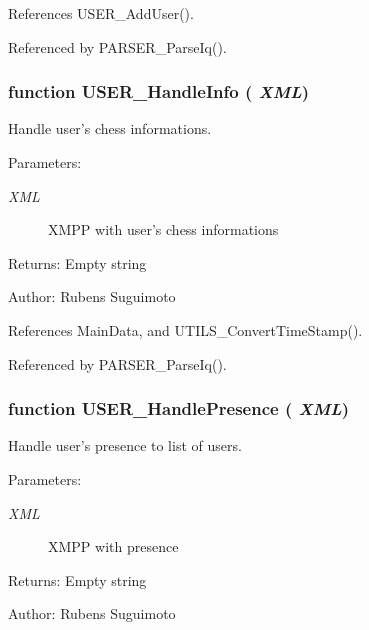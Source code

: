 References USER\_\-AddUser().

Referenced by PARSER\_\-ParseIq().
\subsubsection[USER\_\-HandleInfo]{\setlength{\rightskip}{0pt plus 5cm}function USER\_\-HandleInfo ( {\em XML})}\label{contact_2user_8js_a36e9957d410602ff4b4d465a2ec6444}


Handle user's chess informations. 

\begin{Desc}
\item[Parameters:]
\begin{description}
\item[{\em XML}]XMPP with user's chess informations \end{description}
\end{Desc}
\begin{Desc}
\item[Returns:]Empty string \end{Desc}
\begin{Desc}
\item[Author:]Rubens Suguimoto \end{Desc}


References MainData, and UTILS\_\-ConvertTimeStamp().

Referenced by PARSER\_\-ParseIq().
\subsubsection[USER\_\-HandlePresence]{\setlength{\rightskip}{0pt plus 5cm}function USER\_\-HandlePresence ( {\em XML})}\label{contact_2user_8js_51a93598e63f7afe0a58d19de178e26f}


Handle user's presence to list of users. 

\begin{Desc}
\item[Parameters:]
\begin{description}
\item[{\em XML}]XMPP with presence \end{description}
\end{Desc}
\begin{Desc}
\item[Returns:]Empty string \end{Desc}
\begin{Desc}
\item[Author:]Rubens Suguimoto \end{Desc}


